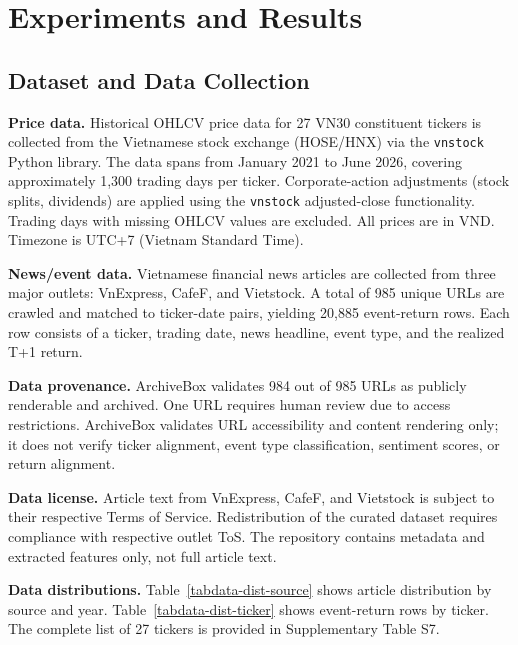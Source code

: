 \documentclass[runningheads]{llncs}
\begin{document}
\section{Experiments and Results}
\label{secexperiments}

\subsection{Dataset and Data Collection}
\label{secdataset}

\textbf{Price data.}
Historical OHLCV price data for 27 VN30 constituent tickers is collected from the Vietnamese stock exchange (HOSE/HNX) via the \texttt{vnstock} Python library. The data spans from January 2021 to June 2026, covering approximately 1,300 trading days per ticker. Corporate-action adjustments (stock splits, dividends) are applied using the \texttt{vnstock} adjusted-close functionality. Trading days with missing OHLCV values are excluded. All prices are in VND. Timezone is UTC+7 (Vietnam Standard Time).

\textbf{News/event data.}
Vietnamese financial news articles are collected from three major outlets: VnExpress, CafeF, and Vietstock. A total of 985 unique URLs are crawled and matched to ticker-date pairs, yielding 20,885 event-return rows. Each row consists of a ticker, trading date, news headline, event type, and the realized T+1 return.

\textbf{Data provenance.}
ArchiveBox validates 984 out of 985 URLs as publicly renderable and archived. One URL requires human review due to access restrictions. ArchiveBox validates URL accessibility and content rendering only; it does not verify ticker alignment, event type classification, sentiment scores, or return alignment.

\textbf{Data license.}
Article text from VnExpress, CafeF, and Vietstock is subject to their respective Terms of Service. Redistribution of the curated dataset requires compliance with respective outlet ToS. The repository contains metadata and extracted features only, not full article text.

\textbf{Data distributions.}
Table~\ref{tabdata-dist-source} shows article distribution by source and year. Table~\ref{tabdata-dist-ticker} shows event-return rows by ticker. The complete list of 27 tickers is provided in Supplementary Table S7.
\end{document}
